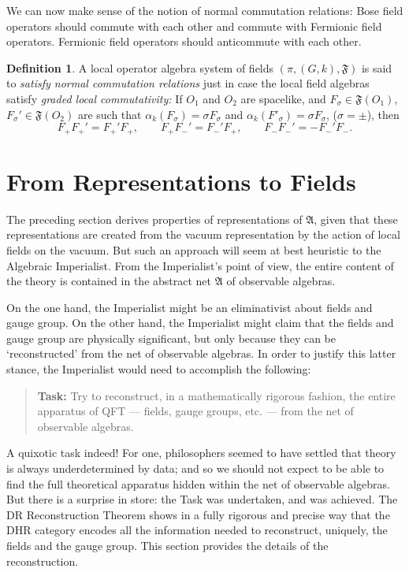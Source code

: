 \documentclass[11pt]{article}
\newenvironment{bxd}%
  {\bigskip\noindent\begin{Sbox}\begin{minipage}{0.9\textwidth} }%
  {\end{minipage}\end{Sbox}\fbox{\TheSbox}\bigskip}%
\newcommand{\alg}[1]{\mathfrak{#1}}
\theoremstyle{definition}
\theoremstyle{definition}
\newtheorem{defn}[thm]{Definition}
\theoremstyle{remark}
\def\al#1{{\mathfrak #1}}
\newcommand{\Rep}{\mathrm{Rep}}
\begin{document}
We can now make sense of the notion of normal commutation relations:
Bose field operators should commute with each other and commute with
Fermionic field operators.  Fermionic field operators should
anticommute with each other.

\begin{bxd}
  \begin{defn} \label{normal-commutation} A local operator algebra
    system of fields $(\pi ,(G,k),\alg{F})$ is said to \emph{satisfy
      normal commutation relations} just in case the local field
    algebras satisfy \emph{graded local commutativity:} If $O_1$ and
    $O_2$ are spacelike, and $F_\sigma\in \alg{F}(O_1)$,
    $F_{\sigma}'\in \alg{F}(O_2)$ are such that $\alpha
    _k(F_{\sigma})=\sigma F_{\sigma}$ and $\alpha
    _k(F'_{\sigma})=\sigma F_{\sigma}$, ($\sigma =\pm$), then
    \[ F_+F_+'=F_+'F_+,\qquad F_+F_-'=F_-'F_+,\qquad F_-F_-'=-F_-'F_- .\]
\end{defn}
\end{bxd}



\section{From Representations to Fields} \label{sec-DR}

The preceding section derives properties of
representations of $\al A$, given that these
representations are created from the vacuum
representation by the action of local fields on the
vacuum.  But such an approach will seem at best
heuristic to the Algebraic Imperialist.  From the
Imperialist's point of view, the entire content of the
theory is contained in the abstract net $\al A$ of
observable algebras.  

On the one hand, the Imperialist might be an eliminativist about
fields and gauge group.  On the other hand, the Imperialist might
claim that the fields and gauge group are physically significant, but
only because they can be `reconstructed' from the net of observable
algebras.  In order to justify this latter stance, the Imperialist
would need to accomplish the following:
\begin{quote} \textbf{Task:} Try to reconstruct, in a
  mathematically rigorous fashion, the entire apparatus
  of QFT --- fields, gauge groups, etc. --- from the
  net of observable algebras.
\end{quote}
A quixotic task indeed! For one, philosophers seemed to
have settled that theory is always underdetermined by
data; and so we should not expect to be able to find
the full theoretical apparatus hidden within the net of
observable algebras.  But there is a surprise in store:
the Task was undertaken, and was achieved.  The DR
Reconstruction Theorem shows in a fully rigorous and
precise way that the DHR category encodes all the
information needed to reconstruct, uniquely, the fields
and the gauge group.  This section provides the details
of the reconstruction.
\end{document}
